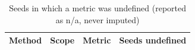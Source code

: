 \begin{table}[ht]
\centering
\small
\caption{Seeds in which a metric was undefined (reported as n/a, never imputed)}
\label{tab:table8_undefined_metrics}
\begin{tabular}{llrr}
\toprule
Method & Scope & Metric & Seeds undefined \\
\midrule
\bottomrule
\end{tabular}
\end{table}
